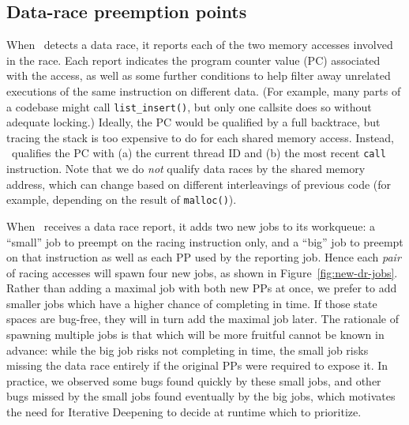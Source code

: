 

\subsection{Data-race preemption points}

When \landslide~detects a data race, it reports each of the two memory accesses involved in the race.
Each report indicates the program counter value (PC) associated with the access, as well as some further conditions to help filter away unrelated executions of the same instruction on different data.
(For example, many parts of a codebase might call {\tt list\_insert()}, but only one callsite does so without adequate locking.)
Ideally, the PC would be qualified by a full backtrace, but tracing the stack is too expensive to do for each shared memory access.
Instead, \landslide~qualifies the PC with
(a) the current thread ID and
(b) the most recent {\tt call} instruction.
Note that we do {\em not} qualify data races by the shared memory address,
which can change based on different interleavings of previous code
(for example, depending on the result of {\tt malloc()}).


When \quicksand~receives a data race report, it adds two new jobs to its workqueue:
a ``small'' job to preempt on the racing instruction only,
and a ``big'' job to preempt on that instruction as well as each PP used by the reporting job.
%
Hence each {\em pair} of racing accesses will spawn four new jobs, as shown in Figure~\ref{fig:new-dr-jobs}.
Rather than adding a maximal job with both new PPs at once, we prefer to add smaller jobs which have a higher chance of completing in time.
If those state spaces are bug-free, they will in turn add the maximal job later.
%
The rationale of spawning multiple jobs is that which will be more fruitful cannot be known in advance:
while the big job risks not completing in time,
the small job risks missing the data race entirely if the original PPs were required to expose it.
In practice, we observed some bugs found quickly by these small jobs, and other bugs missed by the small jobs found eventually by the big jobs,
which motivates the need for Iterative Deepening to decide at runtime which to prioritize.

